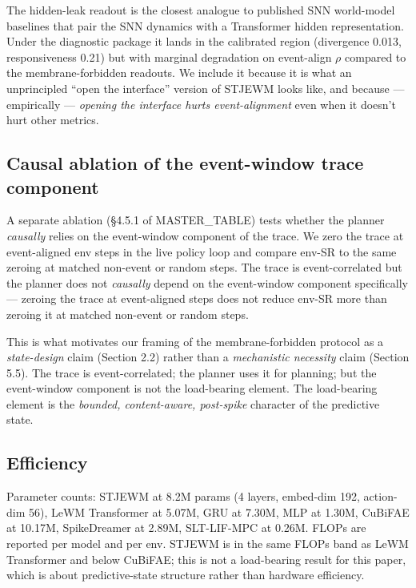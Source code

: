 \documentclass{article}
\begin{document}
The hidden-leak readout is the closest analogue to published SNN
world-model baselines that pair the SNN dynamics with a Transformer
hidden representation. Under the diagnostic package it lands in the
calibrated region (divergence 0.013, responsiveness 0.21) but with
marginal degradation on event-align $\rho$ compared to the
membrane-forbidden readouts. We include it because it is what an
unprincipled ``open the interface'' version of STJEWM looks like,
and because --- empirically --- \emph{opening the interface hurts
event-alignment} even when it doesn't hurt other metrics.

\subsection{Causal ablation of the event-window trace component}

A separate ablation (§4.5.1 of MASTER\_TABLE) tests whether the planner
\emph{causally} relies on the event-window component of the trace. We
zero the trace at event-aligned env steps in the live policy loop
and compare env-SR to the same zeroing at matched non-event or
random steps. The trace is event-correlated but the planner does not
\emph{causally} depend on the event-window component specifically ---
zeroing the trace at event-aligned steps does not reduce env-SR more
than zeroing it at matched non-event or random steps.

This is what motivates our framing of the membrane-forbidden
protocol as a \emph{state-design} claim (Section 2.2) rather than a
\emph{mechanistic necessity} claim (Section 5.5). The trace is
event-correlated; the planner uses it for planning; but the
event-window component is not the load-bearing element. The
load-bearing element is the \emph{bounded, content-aware, post-spike}
character of the predictive state.

\subsection{Efficiency}

Parameter counts: STJEWM at 8.2M params (4 layers, embed-dim 192,
action-dim 56), LeWM Transformer at 5.07M, GRU at 7.30M, MLP at
1.30M, CuBiFAE at 10.17M, SpikeDreamer at 2.89M, SLT-LIF-MPC at
0.26M. FLOPs are reported per model and per env. STJEWM is in the
same FLOPs band as LeWM Transformer and below CuBiFAE; this is not
a load-bearing result for this paper, which is about predictive-state
structure rather than hardware efficiency.
\end{document}
